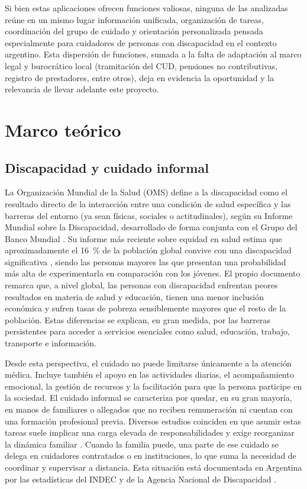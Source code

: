 Si bien estas aplicaciones ofrecen funciones valiosas, ninguna de las analizadas reúne en un mismo lugar información unificada, organización de tareas, coordinación del grupo de cuidado y orientación personalizada pensada especialmente para cuidadores de personas con discapacidad en el contexto argentino. Esta dispersión de funciones, sumada a la falta de adaptación al marco legal y burocrático local (tramitación del CUD, pensiones no contributivas, registro de prestadores, entre otros), deja en evidencia la oportunidad y la relevancia de llevar adelante este proyecto.

\section{Marco teórico}

\subsection{Discapacidad y cuidado informal}

La Organización Mundial de la Salud (OMS) define a la discapacidad como el resultado directo de la interacción entre una condición de salud específica y las barreras del entorno (ya sean físicas, sociales o actitudinales), según su Informe Mundial sobre la Discapacidad, desarrollado de forma conjunta con el Grupo del Banco Mundial \citep{who2011}. Su informe más reciente sobre equidad en salud estima que aproximadamente el 16~\% de la población global convive con una discapacidad significativa \citep{who2022}, siendo las personas mayores las que presentan una probabilidad más alta de experimentarla en comparación con los jóvenes. El propio documento remarca que, a nivel global, las personas con discapacidad enfrentan peores resultados en materia de salud y educación, tienen una menor inclusión económica y sufren tasas de pobreza sensiblemente mayores que el resto de la población. Estas diferencias se explican, en gran medida, por las barreras persistentes para acceder a servicios esenciales como salud, educación, trabajo, transporte e información.

Desde esta perspectiva, el cuidado no puede limitarse únicamente a la atención médica. Incluye también el apoyo en las actividades diarias, el acompañamiento emocional, la gestión de recursos y la facilitación para que la persona participe en la sociedad. El cuidado informal se caracteriza por quedar, en su gran mayoría, en manos de familiares o allegados que no reciben remuneración ni cuentan con una formación profesional previa. Diversos estudios coinciden en que asumir estas tareas suele implicar una carga elevada de responsabilidades y exige reorganizar la dinámica familiar \citep{pearlin1990,zhao2022}. Cuando la familia puede, una parte de ese cuidado se delega en cuidadores contratados o en instituciones, lo que suma la necesidad de coordinar y supervisar a distancia. Esta situación está documentada en Argentina por las estadísticas del INDEC y de la Agencia Nacional de Discapacidad \citep{indec2018,andis2023}.

